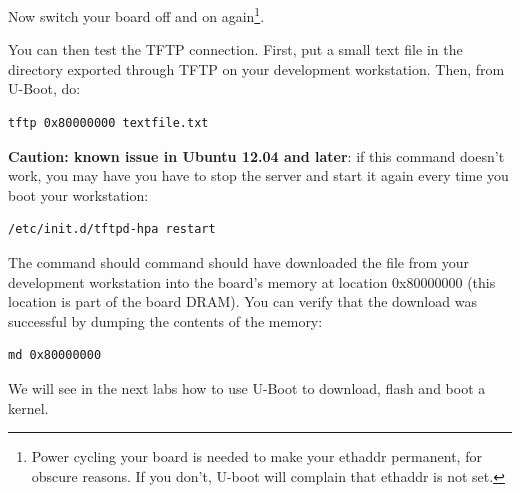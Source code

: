 Now switch your board off and on again\footnote{Power cycling your
  board is needed to make your ethaddr permanent, for obscure
  reasons. If you don't, U-boot will complain that ethaddr is not
  set.}.

You can then test the TFTP connection. First, put a small text file in
the directory exported through TFTP on your development
workstation. Then, from U-Boot, do:

\begin{verbatim}
tftp 0x80000000 textfile.txt
\end{verbatim}

{\bf Caution: known issue in Ubuntu 12.04 and later}:
if this command doesn't work, you may have you have to stop the server
and start it again every time you boot your workstation:

\begin{verbatim}
/etc/init.d/tftpd-hpa restart
\end{verbatim}

The  command should command should have downloaded
the  file from your development
workstation into the board's memory at location 0x80000000 (this
location is part of the board DRAM). You can verify that the download
was successful by dumping the contents of the memory:

\begin{verbatim}
md 0x80000000
\end{verbatim}

We will see in the next labs how to use U-Boot to download, flash and
boot a kernel.
